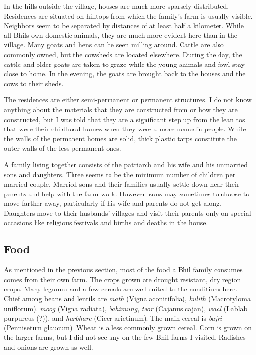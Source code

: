 \documentclass[report.tex]{subfiles}
\begin{document}
In the hills outside the village, houses are much more sparsely distributed. Residences are situated on hilltops from which the family's farm is usually visible. Neighbors seem to be separated by distances of at least half a kilometer. While all Bhils own domestic animals, they are much more evident here than in the village. Many goats and hens can be seen milling around. Cattle are also commonly owned, but the cowsheds are located elsewhere. During the day, the cattle and older goats are taken to graze while the young animals and fowl stay close to home. In the evening, the goats are brought back to the houses and the cows to their sheds.

The residences are either semi-permanent or permanent structures. I do not know anything about the materials that they are constructed from or how they are constructed, but I was told that they are a significant step up from the lean tos that were their childhood homes when they were a more nomadic people. While the walls of the permanent homes are solid, thick plastic tarps constitute the outer walls of the less permanent ones.

A family living together consists of the patriarch and his wife and his unmarried sons and daughters. Three seems to be the minimum number of children per married couple. Married sons and their families usually settle down near their parents and help with the farm work. However, sons may sometimes to choose to move farther away, particularly if his wife and parents do not get along. Daughters move to their husbands' villages and visit their parents only on special occasions like religious festivals and births and deaths in the house.

\subsection{Food}

As mentioned in the previous section, most of the food a Bhil family consumes comes from their own farm. The crops grown are drought resistant, dry region crops. Many legumes and a few cereals are well suited to the conditions here. Chief among beans and lentils are \textit{math} (Vigna aconitifolia), \textit{kulith} (Macrotyloma uniflorum), \textit{moog} (Vigna radiata), \textit{bahimung}, \textit{toor} (Cajanus cajan), \textit{waal} (Lablab purpureus (?)), and \textit{harbhare} (Cicer arietinum). The main cereal is \textit{bajri} (Pennisetum glaucum). Wheat is a less commonly grown cereal. Corn is grown on the larger farms, but I did not see any on the few Bhil farms I visited. Radishes and onions are grown as well.
\end{document}
